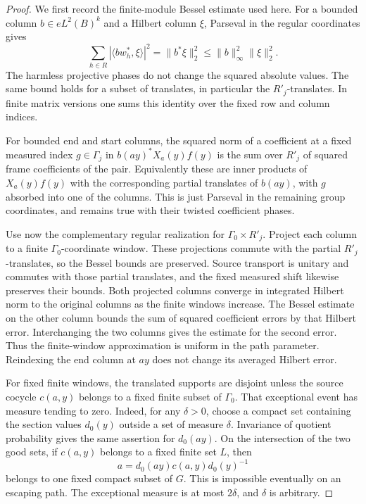 \begin{proof}
We first record the finite-module Bessel estimate used here. For
a bounded column \(b\in eL^2(B)^k\) and a Hilbert column \(\xi\),
Parseval in the regular coordinates gives
\[
 \sum_{h\in R}|\langle b w_h^*,\xi\rangle|^2
       =\|b^*\xi\|_2^2
       \leq\|b\|_\infty^2\|\xi\|_2^2.
\]
The harmless projective phases do not change the squared absolute
values. The same bound holds for a subset of translates, in
particular the \(R'_j\)-translates. In finite matrix versions one
sums this identity over the fixed row and column indices.

For bounded end and start columns, the squared norm of a coefficient
at a fixed measured index \(g\in\Gamma_j\) in
\(b(ay)^*X_a(y)f(y)\) is the sum over \(R'_j\) of squared
frame coefficients of the pair. Equivalently these are inner
products of \(X_a(y)f(y)\) with the corresponding partial
translates of \(b(ay)\), with \(g\) absorbed into one of the
columns. This is just Parseval in the remaining group coordinates,
and remains true with their twisted coefficient phases.

Use now the complementary regular realization for
\(\Gamma_0\times R'_j\). Project each column to a finite
\(\Gamma_0\)-coordinate window. These projections commute with
the partial \(R'_j\)-translates, so the Bessel bounds are
preserved. Source transport is unitary and commutes with those
partial translates, and the fixed measured shift likewise
preserves their bounds. Both projected columns converge in
integrated Hilbert norm to the original columns as the finite
windows increase. The Bessel estimate on the other column bounds
the sum of squared coefficient errors by that Hilbert error.
Interchanging the two columns gives the estimate for the second
error. Thus the finite-window approximation is uniform in the
path parameter. Reindexing the end column at \(ay\) does not
change its averaged Hilbert error.

For fixed finite windows, the translated supports are disjoint
unless the source cocycle \(c(a,y)\) belongs to a fixed finite
subset of \(\Gamma_0\). That exceptional event has measure
tending to zero. Indeed, for any \(\delta>0\), choose a compact
set containing the section values \(d_0(y)\) outside a set of
measure \(\delta\). Invariance of quotient probability gives
the same assertion for \(d_0(ay)\). On the intersection of the
two good sets, if \(c(a,y)\) belongs to a fixed finite set
\(L\), then
\[
 a=d_0(ay)c(a,y)d_0(y)^{-1}
\]
belongs to one fixed compact subset of \(G\). This is impossible
eventually on an escaping path. The exceptional measure is at
most \(2\delta\), and \(\delta\) is arbitrary.


\end{proof}
